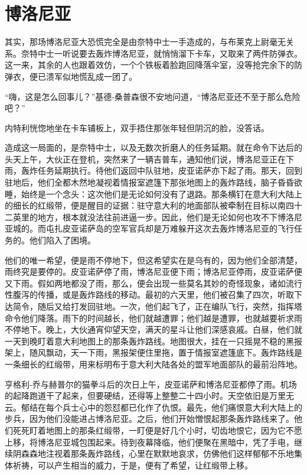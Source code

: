 \chapter{博洛尼亚}
 
    其实，那场博洛尼亚大恐慌完全是由奈特中士一手造成的，与布莱克上尉毫无关系。奈特中士一听说要去轰炸博洛尼亚，就悄悄溜下卡车，又取来了两件防弹衣。这一来，其余的人也跟着效仿，一个个铁板着脸跑回降落伞室，没等抢完余下的防弹衣，便已溃军似地慌乱成一团了。

    “嗨，这是怎么回事儿？”基德-桑普森很不安地问道，“博洛尼亚还不至于那么危险吧？”

    内特利恍惚地坐在卡车铺板上，双手捂住那张年轻但阴沉的脸，没答话。

    造成这一局面的，是奈特中士，以及无数次折磨人的任务延期。就在命令下达后的头天上午，大伙正在登机，突然来了一辆吉普车，通知他们说，博洛尼亚正在下雨，轰炸任务延期执行。待他们返回中队驻地，皮亚诺萨亦下起了雨。那天，回到驻地后，他们全都木然地凝视着情报室遮篷下那张地图上的轰炸路线，脑子昏昏欲睡，始终是一个念头：这次他们是无论如何没有了退路。那条横钉在意大利大陆上的细长的红缎带，便是醒目的证据：驻守意大利的地面部队被牵制在目标以南四十二英里的地方，根本就没法往前进逼一步。因此，他们是无论如何也攻不下博洛尼亚城的。而屯扎皮亚诺萨岛的空军官兵却是万难躲开这次去轰炸博洛尼亚的飞行任务的。他们陷入了困境。

    他们的唯一希望，便是雨不停地下，但这希望实在是乌有的，因为他们全部清楚，雨终究是要停的。皮亚诺萨停了雨，博洛尼亚便下雨；博洛尼亚停雨，皮亚诺萨便又下雨。假如两地都没了雨，那么，便会出现一些莫名其妙的奇怪现象，诸如流行性腹泻的传播，或是轰炸路线的移动。最初的六天里，他们被召集了四次，听取下达简令，随后又给打发回驻地。一次，他们起飞了，正在编队飞行，突然，指挥塔命令他们降落。雨下的时间越长，他们就越遭罪；他们越是遭罪，也就越要祈求雨不停地下。晚上，大伙通宵仰望天空，满天的星斗让他们深感哀戚。白昼，他们就一天到晚盯着意大利地图上的那条轰炸路线。地图很大，挂在一只摇晃不稳的黑报架上，随风飘动，天一下雨，黑报架便住里拖，置于情报室遮篷底下。轰炸路线是一条细长的红缎带，用来标明布于意大利大陆各处的盟军地面部队的最前沿阵地。

    亨格利-乔与赫普尔的猫拳斗后的次日上午，皮亚诺萨和博洛尼亚都停了雨。机场的起降跑道干了起来，但要硬结，还得等上整整二十四小时。天空依旧是万里无云。郁结在每个兵士心中的怨怼都已化作了仇恨。最先，他们痛恨意大利大陆上的步兵，因为他们没能进占博洛尼亚。之后，他们开始憎恨起那条轰炸路线来了。他们死死盯着地图上的那条红缎带，一盯便是好几个小时，切齿地恨它，因为它不愿上移，将博洛尼亚城包围起来。待到夜幕降临，他们便聚在黑暗中，凭了手电，继续阴森森地注视着那条轰炸路线，心里在默默地哀求，仿佛他们这样郁郁不乐地集体祈祷，可以产生相当的威力，于是，便有了希望，让红缎带上移。

